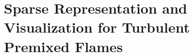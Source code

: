 \chapter[Sparse Representation for Turbulent Premixed Flames]
        {Sparse Representation and Visualization for Turbulent Premixed Flames} %
\label{cha:sparse_representation}
%
%

%

%

%

%

%

%
